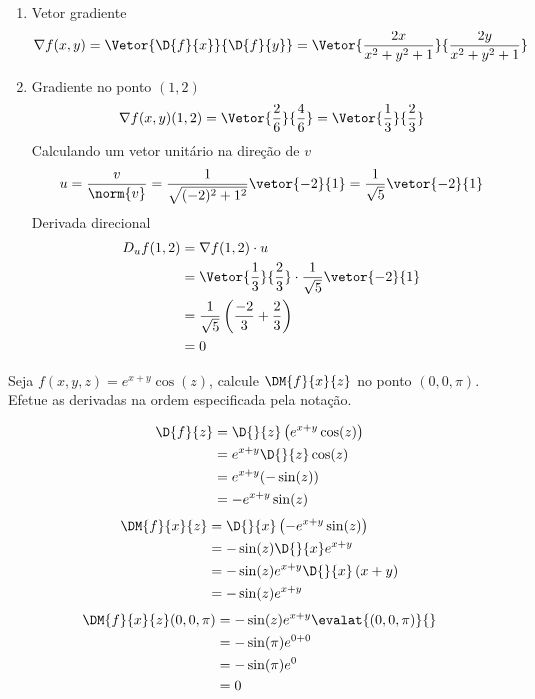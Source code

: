 \documentclass[a4paper,12pt,fleqn]{article}
\begin{document}
\begin{answer}
  \begin{enumerate}[label=\alph*)]
    \item
      Vetor gradiente
      \[
        \nabla f(x, y)
        = \Vetor{\D{f}{x}}{\D{f}{y}}
        = \Vetor{\frac{2x}{x^2 + y^2 + 1}}{\frac{2y}{x^2 + y^2 + 1}}
      \]
    \item
      Gradiente no ponto $(1, 2)$
      \[
        \nabla f(x, y) (1, 2)
        = \Vetor{\frac{2}{6}}{\frac{4}{6}}
        = \Vetor{\frac{1}{3}}{\frac{2}{3}}
      \]
      Calculando um vetor unitário na direção de $v$
      \[
        u
        = \frac{v}{\norm{v}}
        = \frac{1}{\sqrt{(-2)^2 + 1^2}} \vetor{-2}{1}
        = \frac{1}{\sqrt{5}} \vetor{-2}{1}
      \]
      Derivada direcional
      \begin{align*}
        D_u f(1, 2)
        & = \nabla f(1, 2) \cdot u                       \\
        & = \Vetor{\frac{1}{3}}{\frac{2}{3}} \cdot \frac{1}{\sqrt{5}} \vetor{-2}{1} \\
        & = \frac{1}{\sqrt{5}} \left( \frac{-2}{3} + \frac{2}{3} \right) \\
        &  = 0
      \end{align*}
  \end{enumerate}
\end{answer}

Seja \( f(x, y, z) = e^{x+y} \cos(z) \),
calcule \( \DM{f}{x}{z} \) no ponto \( (0, 0, \pi) \).
Efetue as derivadas na ordem especificada pela notação.
\clearpagequestiononly

\begin{answer}
\begin{align*}
  \D{f}{z}
  & = \D{}{z}\left(e^{x+y} \cos(z)\right) \\
  & = e^{x+y} \D{}{z}\cos(z)\\
  & = e^{x+y} (-\sin(z)) \\
  & = -e^{x+y} \sin(z)
\end{align*}
\begin{align*}
  \DM{f}{x}{z}
  & = \D{}{x}\left(-e^{x+y} \sin(z)\right) \\
  & = -\sin(z)\D{}{x}e^{x+y} \\
  & = -\sin(z)e^{x+y}\D{}{x}\left(x+y\right) \\
  & = -\sin(z) e^{x+y}
\end{align*}
\begin{align*}
  \DM{f}{x}{z}(0, 0, \pi)
  & = -\sin(z) e^{x+y} \evalat{(0, 0, \pi)}{} \\
  & = -\sin(\pi) e^{0+0} \\
  & = -\sin(\pi) e^0 \\
  & = 0
\end{align*}
\end{answer}

\end{document}
